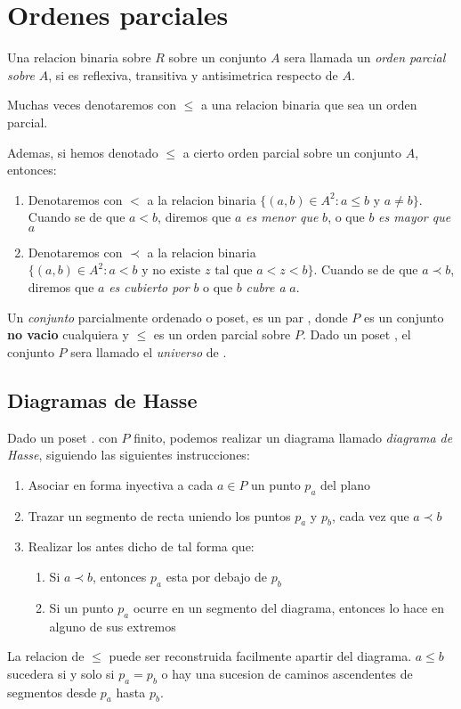 

\section{Ordenes parciales}
\begin{definition}
  Una relacion binaria sobre $R$ sobre un conjunto $A$ sera llamada un \emph{orden parcial sobre} $A$,
  si es reflexiva, transitiva y antisimetrica respecto de $A$.
  
  Muchas veces denotaremos con $\leq$ a una relacion binaria que sea un orden parcial.

  Ademas, si hemos denotado $\leq$ a cierto orden parcial sobre un conjunto $A$, entonces:
  \begin{enumerate}
    \item Denotaremos con $<$ a la relacion binaria $\{(a, b) \in A^2 : a \leq b \text{ y } a \neq b\}$. Cuando se
    de que $a < b$, diremos que $a$ \emph{es menor que} $b$, o que $b$ \emph{es mayor que} $a$
    \item Denotaremos con $\prec$ a la relacion binaria $\{(a, b) \in A^2 : a < b \text{ y no existe $z$ tal que $a < z < b$}\}$.
    Cuando se de que $a \prec b$, diremos que $a$ \emph{es cubierto por} $b$ o que $b$ \emph{cubre a} $a$.
  \end{enumerate}
\end{definition}

\begin{definition}
  Un \emph{conjunto} parcialmente ordenado o poset, es un par \poset, donde $P$ es un conjunto \textbf{no vacio}
  cualquiera y $\leq$ es un orden parcial sobre $P$. Dado un poset \poset, el conjunto $P$ sera llamado el \emph{universo} de \poset.
\end{definition}

\subsection{Diagramas de Hasse}
Dado un poset \poset. con $P$ finito, podemos realizar un diagrama llamado \emph{diagrama de Hasse}, siguiendo las siguientes instrucciones:
\begin{enumerate}
  \item Asociar en forma inyectiva a cada $a \in P$ un punto $p_a$ del plano
  \item Trazar un segmento de recta uniendo los puntos $p_a$ y $p_b$, cada vez que $a \prec b$
  \item Realizar los antes dicho de tal forma que: \begin{enumerate}
    \item Si $a \prec b$, entonces $p_a$ esta por debajo de $p_b$
    \item Si un punto $p_a$ ocurre en un segmento del diagrama, entonces lo hace en alguno de sus extremos 
  \end{enumerate}
\end{enumerate}
La relacion de $\leq$ puede ser reconstruida facilmente apartir del diagrama. $a \leq b$ sucedera si y solo si
$p_a = p_b$ o hay una sucesion de caminos ascendentes de segmentos desde $p_a$ hasta $p_b$.

